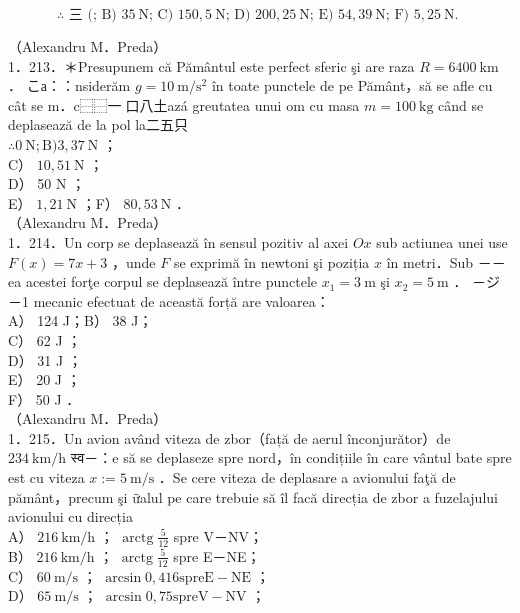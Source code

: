 \documentclass[10pt]{article}
\begin{document}
$$
\therefore \text { 三 (; B) } 35 \mathrm{~N} \text {; C) } 150,5 \mathrm{~N} \text {; D) } 200,25 \mathrm{~N} \text {; E) } 54,39 \mathrm{~N} \text {; F) } 5,25 \mathrm{~N} \text {. }
$$

（Alexandru M．Preda）\\
1．213．＊Presupunem că Pământul este perfect sferic şi are raza $R=6400 \mathrm{~km}$ ． こа：：nsiderăm $g=10 \mathrm{~m} / \mathrm{s}^{2}$ în toate punctele de pe Pământ，să se afle cu cât se m．c⿱⿱一𫝀口八土azá greutatea unui om cu masa $m=100 \mathrm{~kg}$ când se deplasează de la pol la二五只\\
$\therefore 0 \mathrm{~N} ; \mathrm{B}) 3,37 \mathrm{~N}$ ；\\
C） $10,51 \mathrm{~N}$ ；\\
D） 50 N ；\\
E） $1,21 \mathrm{~N}$ ；F） $80,53 \mathrm{~N}$ ．\\
（Alexandru M．Preda）\\
1．214．Un corp se deplasează în sensul pozitiv al axei $O x$ sub actiunea unei use $F(x)=7 x+3$ ，unde $F$ se exprimă în newtoni şi poziția $x$ în metri．Sub －－ea acestei forţe corpul se deplasează între punctele $x_{1}=3 \mathrm{~m}$ şi $x_{2}=5 \mathrm{~m}$ ． －ジ－1 mecanic efectuat de această forță are valoarea：\\
A） 124 J；B） 38 J；\\
C） 62 J ；\\
D） 31 J ；\\
E） 20 J ；\\
F） 50 J ．\\
（Alexandru M．Preda）\\
1．215．Un avion având viteza de zbor（față de aerul înconjurător）de $234 \mathrm{~km} / \mathrm{h}$ स्व－：e să se deplaseze spre nord，în condițiile în care vântul bate spre est cu viteza $x:=5 \mathrm{~m} / \mathrm{s}$ ．Se cere viteza de deplasare a avionului faţă de pământ，precum şi ữalul pe care trebuie să îl facă direcția de zbor a fuzelajului avionului cu direcția\\
A） $216 \mathrm{~km} / \mathrm{h}$ ； $\operatorname{arctg} \frac{5}{12}$ spre V－NV；\\
B） $216 \mathrm{~km} / \mathrm{h}$ ； $\operatorname{arctg} \frac{5}{12}$ spre E－NE；\\
C） $60 \mathrm{~m} / \mathrm{s}$ ； $\arcsin 0,416 \mathrm{spre} \mathrm{E}-\mathrm{NE}$ ；\\
D） $65 \mathrm{~m} / \mathrm{s}$ ； $\arcsin 0,75 \mathrm{spre} \mathrm{V}-\mathrm{NV}$ ；\\
\end{document}
